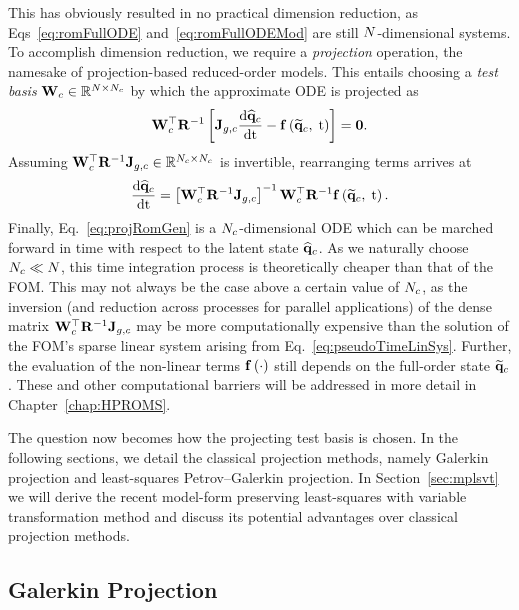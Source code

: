 This has obviously resulted in no practical dimension reduction, as Eqs~\ref{eq:romFullODE} and~\ref{eq:romFullODEMod} are still $N$-dimensional systems. To accomplish dimension reduction, we require a \textit{projection} operation, the namesake of projection-based reduced-order models. This entails choosing a \textit{test basis} $\testBasisCons \inRTwo{\numDOF}{\numConsModes}$ by which the approximate ODE is projected as
%
\begin{equation}\label{eq:contRomRes}
    \testBasisCons^\top \resScaleInv \left[\jacobDecodeCons \ode{\consVecCoef}{\timeVar} - \rhsFunc{\consVecRom, \; \timeVar} \right] = \zeroVec.
\end{equation}
%
Assuming $\testBasisCons^\top \resScaleInv \jacobDecodeCons \inRTwo{\numConsModes}{\numConsModes}$ is invertible, rearranging terms arrives at
%
\begin{equation}\label{eq:projRomGen}
    \ode{\consVecCoef}{\timeVar} = \left[\testBasisCons^\top \resScaleInv \jacobDecodeCons\right]^{-1} \testBasisCons^\top \resScaleInv \rhsFunc{\consVecRom, \; \timeVar}.
\end{equation}
%
Finally, Eq.~\ref{eq:projRomGen} is a $N_c$-dimensional ODE which can be marched forward in time with respect to the latent state $\mathbf{\widehat{q}}_{c}$. As we naturally choose $N_c \ll N$, this time integration process is theoretically cheaper than that of the FOM. This may not always be the case above a certain value of $N_c$, as the inversion (and reduction across processes for parallel applications) of the dense matrix $\testBasisCons^\top \resScaleInv \jacobDecodeCons$ may be more computationally expensive than the solution of the FOM's sparse linear system arising from Eq.~\ref{eq:pseudoTimeLinSys}. Further, the evaluation of the non-linear terms $\mathbf{f} \left(\cdot\right)$ still depends on the full-order state $\mathbf{\widetilde{q}}_{c}$. These and other computational barriers will be addressed in more detail in Chapter~\ref{chap:HPROMS}.

The question now becomes how the projecting test basis is chosen. In the following sections, we detail the classical projection methods, namely Galerkin projection and least-squares Petrov--Galerkin projection. In Section~\ref{sec:mplsvt} we will derive the recent model-form preserving least-squares with variable transformation method and discuss its potential advantages over classical projection methods.

\subsection{Galerkin Projection}

